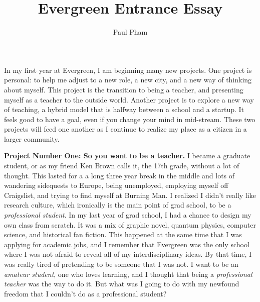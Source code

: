 \documentclass{article}
\title{Evergreen Entrance Essay}
\author{Paul Pham}
\begin{document}
\maketitle

In my first year at Evergreen, I am beginning many new projects. One project is
personal: to help me adjust to a new role, a
new city, and a new way of thinking about myself.
This project is the transition to being a teacher,
and presenting myself as a teacher to the outside world.
Another project is to explore a new way of teaching,
a hybrid model that is halfway between a school
and a startup. It
feels good to have a goal, even if you change your mind in mid-stream.
These two projects will feed
one another as I continue to realize my place as a
citizen in a larger community.

\textbf{Project Number One:
So you want to be a teacher.}
I became a
graduate student, or as my friend Ken Brown calls it,
the 17th grade, without a lot of thought. This 
lasted for a
a long three year break in the middle and lots of
wandering sidequests to Europe,
being unemployed, employing myself off Craigslist,
and trying to find myself at Burning Man.
I realized I didn't
really like research culture, which 
ironically is the main point of grad school, to
be a \emph{professional student}.
In my
last year of grad school, I had a chance to
design my own class from scratch. It was a mix of
graphic novel, quantum physics, computer science,
and historical fan fiction. This happened
at the same time that I was applying for
academic jobs, and
I remember that Evergreen was the only school where
I was not afraid to reveal all of my
interdisciplinary ideas. By that time, I was really
tired of pretending to be someone that I was not.
I want to be an \emph{amateur student}, one who
loves learning, and I thought that being a
\emph{professional teacher} was the way to do it.
But what was I going to do with my newfound freedom
that I couldn't do as a professional student?
\end{document}
